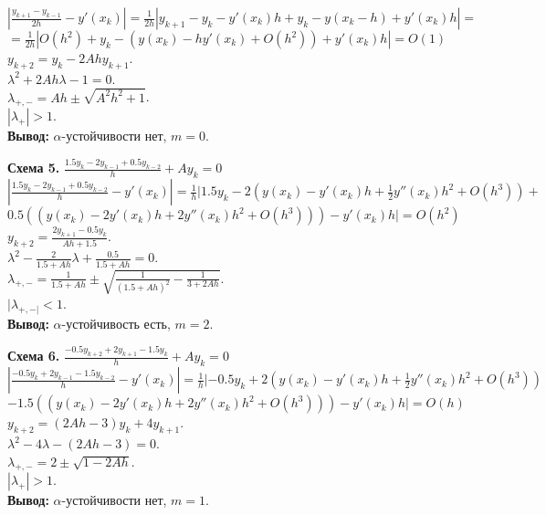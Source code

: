 \documentclass[14pt,a4paper]{extarticle}
\newcommand{\1}{\mathbbm{1}}
\begin{document}
$|\frac{y_{k+1}-y_{k-1}}{2h} - y'(x_k)| = \frac{1}{2 h} |y_{k+1} - y_k - y'(x_k) h + y_k - y(x_{k} - h) + y'(x_k) h| =$\\
$= \frac{1}{2 h} |O(h^2) + y_k - (y(x_k) - h y'(x_k) + O(h^2)) + y'(x_k) h| = O(1)$ \\
 $y_{k+2} = y_{k} - 2 A h y_{k+1} $.\\
 $\lambda^2 + 2 A h \lambda - 1 = 0$. \\
 $\lambda_{+, -} = A h \pm \sqrt{A^2 h^2 + 1}$. \\
 $|\lambda_{+}| > 1 $. \\
 \textbf{Вывод:} $\alpha$-устойчивости нет, $m=0$.
 \par
 \textbf{Схема 5.} $\frac{1.5 y_k-2 y_{k-1}+0.5 y_{k-2}}{h}+A y_k=0$ \\ 
$|\frac{1.5 y_k-2 y_{k-1}+0.5 y_{k-2}}{h} -y'(x_k)| = \frac{1}{h} |1.5 y_k-2(y(x_k) - y'(x_k)h +\frac{1}{2} y''(x_k)h^2 + O(h^3))+$
$0.5 ((y(x_k) - 2 y'(x_k)h +2 y''(x_k)h^2 + O(h^3))) -y'(x_k) h| = O(h^2)$\\
$y_{k+2} = \frac{2 y_{k+1} - 0.5 y_{k}}{A h + 1.5} $.\\
$\lambda^2 - \frac{2}{1.5 + Ah} \lambda + \frac{0.5}{1.5 + Ah} = 0$.\\
$\lambda_{+, -} = \frac{1}{1.5 + Ah} \pm \sqrt{\frac{1}{(1.5 + Ah)^2} - \frac{1}{3 + 2 Ah} }$. \\
$|\lambda_{+, -|} < 1$. \\
\textbf{Вывод:} $\alpha$-устойчивость есть, $m=2$.
\par
\textbf{Схема 6.} $\frac{-0.5 y_{k+2}+2 y_{k+1}-1.5 y_k}{h}+A y_k=0$ \\ 
$|\frac{-0.5 y_k + 2 y_{k-1} - 1.5 y_{k-2}}{h} -y'(x_k)| = \frac{1}{h} |-0.5 y_k+2(y(x_k) - y'(x_k)h +\frac{1}{2} y''(x_k)h^2 + O(h^3))$
$-1.5 ((y(x_k) - 2 y'(x_k)h +2 y''(x_k)h^2 + O(h^3))) -y'(x_k) h| = O(h)$\\
$y_{k+2} = (2 A h - 3) y_k + 4 y_{k+1}$.\\
$\lambda^2  - 4 \lambda - (2 A h - 3) = 0$.\\
$\lambda_{+, -} = 2 \pm \sqrt{1 - 2 A h}$.\\
$|\lambda_{+}| > 1 $. \\
\textbf{Вывод:} $\alpha$-устойчивости нет, $m=1$.
\end{document}
